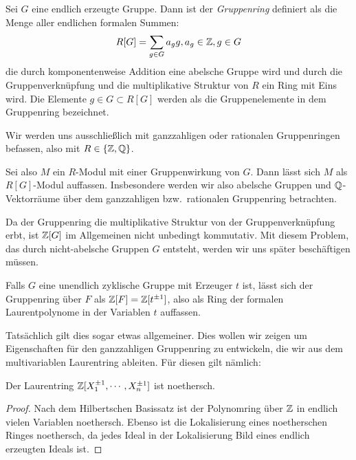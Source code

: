      \begin{defn}[Gruppenring]
    		Sei $G$ eine endlich erzeugte Gruppe. Dann ist der \textit{Gruppenring} definiert als die Menge aller endlichen formalen Summen:
    		\[
    			R[G] = \sum_{g \in G} a_g g, a_g \in \mathbb{Z}, g \in G
    		\]
            die durch komponentenweise Addition eine abelsche Gruppe wird und durch die Gruppenverknüpfung und die multiplikative Struktur von $R$ ein Ring mit Eins wird. Die Elemente $g \in G \subset R[G]$ werden als die Gruppenelemente in dem Gruppenring bezeichnet.
    	\end{defn}
    	Wir werden uns ausschließlich mit ganzzahligen oder rationalen Gruppenringen befassen, also mit $R \in \{ \mathbb{Z},\mathbb{Q}\}$.
    	\begin{bem}
    	\label{bem:gruppenwirkungmodul}
    		Sei also $M$ ein $R$-Modul mit einer Gruppenwirkung von $G$. Dann lässt sich $M$ als $R[G]$-Modul auffassen. Insbesondere werden wir also abelsche Gruppen und $\mathbb{Q}$-Vektorräume über dem ganzzahligen bzw.\ rationalen Gruppenring betrachten.
    	\end{bem}
        \begin{bem}
            Da der Gruppenring die multiplikative Struktur von der Gruppenverknüpfung erbt, ist $\mathbb{Z} [G]$ im Allgemeinen nicht unbedingt kommutativ. Mit diesem Problem, das durch nicht-abelsche Gruppen $G$ entsteht, werden wir uns später beschäftigen müssen.
        \end{bem}
\begin{bsp}
        Falls $G$ eine unendlich zyklische Gruppe mit Erzeuger $t$ ist, lässt sich der Gruppenring über $F$ als $\mathbb{Z}[F] = \mathbb{Z}[t^{\pm 1}]$, also als Ring der formalen Laurentpolynome in der Variablen $t$ auffassen. 
\end{bsp}
Tatsächlich gilt dies sogar etwas allgemeiner. Dies wollen wir zeigen um Eigenschaften für den ganzzahligen Gruppenring zu entwickeln, die wir aus dem multivariablen Laurentring ableiten. Für diesen gilt nämlich:
\begin{prop}
	Der Laurentring $\mathbb{Z}[X_1^{\pm 1},\cdots,X_{n}^{\pm 1}] $ ist noethersch.
\end{prop}
\begin{proof}
	Nach dem Hilbertschen Basissatz ist der Polynomring über $\mathbb{Z}$ in endlich vielen Variablen noethersch. Ebenso ist die Lokalisierung eines noetherschen Ringes noethersch, da jedes Ideal in der Lokalisierung Bild eines endlich erzeugten Ideals ist. 
\end{proof}


